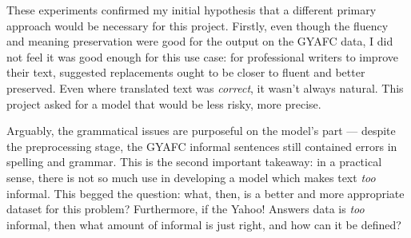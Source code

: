 These experiments confirmed my initial hypothesis that a different primary approach would be necessary for this project. Firstly, even though the fluency and meaning preservation were good for the output on the GYAFC data, I did not feel it was good enough for this use case: for professional writers to improve their text, suggested replacements ought to be closer to fluent and better preserved. Even where translated text was \textit{correct}, it wasn't always natural. This project asked for a model that would be less risky, more precise.

Arguably, the grammatical issues are purposeful on the model's part --- despite the preprocessing stage, the GYAFC informal sentences still contained errors in spelling and grammar. This is the second important takeaway: in a practical sense, there is not so much use in developing a model which makes text \textit{too} informal. This begged the question: what, then, is a better and more appropriate dataset for this problem? Furthermore, if the Yahoo! Answers data is \textit{too} informal, then what amount of informal is just right, and how can it be defined?
